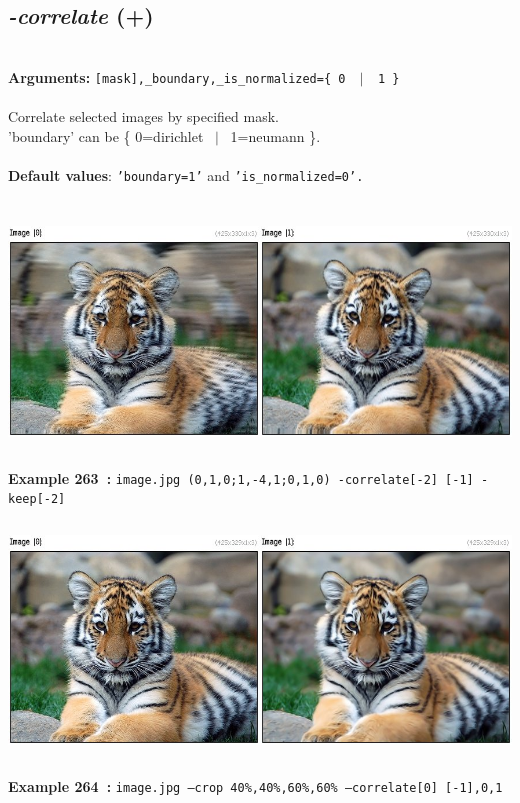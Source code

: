 \documentclass[a4paper,11pt,twoside]{book}
\begin{document}
\subsection{\emph{-correlate} (+)}\vspace*{-0.5em}
~\\\textbf{Arguments: } 
{\small \texttt{[mask],\_boundary,\_is\_normalized=\{ 0 ~$|$~ 1 \}}}\\~\\
Correlate selected images by specified mask.
~\\'boundary' can be \{ 0=dirichlet ~$|$~ 1=neumann \}.
~\\~\\\textbf{Default values}: {\small \texttt{'boundary=1'} and \texttt{'is\_normalized=0'.}}
\begin{center}\includegraphics[keepaspectratio=true,height=7cm,width=\textwidth]{img/gmic_def263.jpg}\\
{\footnotesize \textbf{Example 263~:} \texttt{image.jpg (0,1,0;1,-4,1;0,1,0) -correlate[-2] [-1] -keep[-2]}}
\\\includegraphics[keepaspectratio=true,height=7cm,width=\textwidth]{img/gmic_def264.jpg}\\
{\footnotesize \textbf{Example 264~:} \texttt{image.jpg --crop 40\%,40\%,60\%,60\% --correlate[0] [-1],0,1}}
\end{center}
\end{document}
